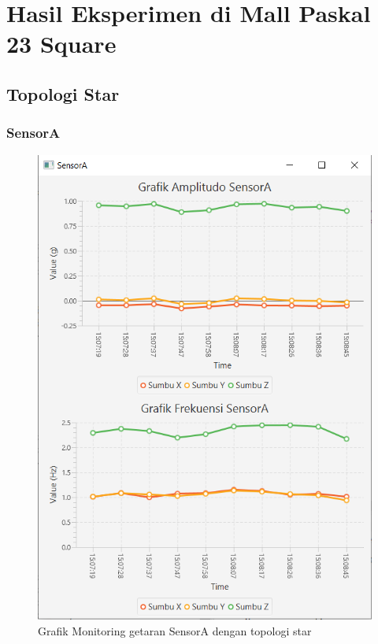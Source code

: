 \chapter{Hasil Eksperimen di Mall Paskal 23 Square}
\label{lamp:B}

\def\scl{1}
\def\leg{} 
\def\std{none}
\def\ymin{}
\def\ymax{}

\section{Topologi Star}

\subsection{SensorA}
\begin{figure}[H] 
	\centering  
	\includegraphics[scale=1]{Lampiran/HasilPengujian/sensorA_star.PNG} 
	\caption[Grafik Monitoring getaran SensorA dengan topologi star]{Grafik Monitoring getaran SensorA dengan topologi star}
	\label{fig:grafik_A_star_paskal} 
\end{figure}

